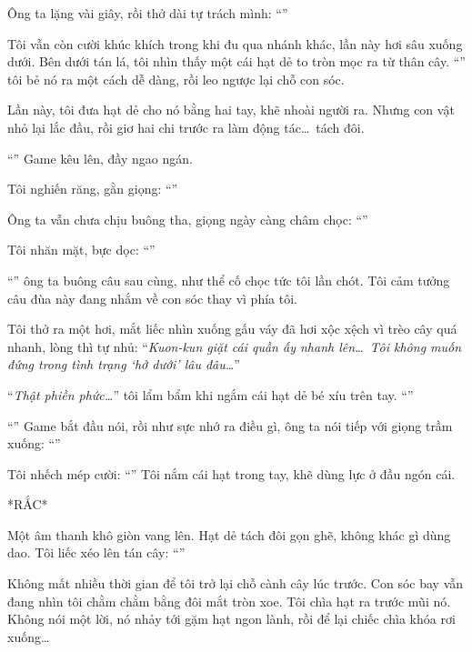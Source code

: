 \documentclass[../main.tex]{subfiles}
\begin{document}
Ông ta lặng vài giây, rồi thở dài tự trách mình: ``''

Tôi vẫn còn cười khúc khích trong khi đu qua nhánh khác, lần này hơi sâu xuống dưới. Bên dưới tán lá, tôi nhìn thấy một cái hạt dẻ to tròn mọc ra từ thân cây. ``'' tôi bẻ nó ra một cách dễ dàng, rồi leo ngược lại chỗ con sóc.

Lần này, tôi đưa hạt dẻ cho nó bằng hai tay, khẽ nhoài người ra. Nhưng con vật nhỏ lại lắc đầu, rồi giơ hai chi trước ra làm động tác\dots\ tách đôi.

``'' Game kêu lên, đầy ngao ngán.

Tôi nghiến răng, gằn giọng: ``''

Ông ta vẫn chưa chịu buông tha, giọng ngày càng châm chọc: ``''

Tôi nhăn mặt, bực dọc: ``''

``'' ông ta buông câu sau cùng, như thể cố chọc tức tôi lần chót. Tôi cảm tưởng câu đùa này đang nhắm về con sóc thay vì phía tôi.

Tôi thở ra một hơi, mắt liếc nhìn xuống gấu váy đã hơi xộc xệch vì trèo cây quá nhanh, lòng thì tự nhủ: ``\textit{Kuon-kun giặt cái quần ấy nhanh lên\dots\ Tôi không muốn đứng trong tình trạng `hở dưới' lâu đâu\dots}''

``\textit{Thật phiền phức\dots}'' tôi lẩm bẩm khi ngắm cái hạt dẻ bé xíu trên tay. ``''

``'' Game bắt đầu nói, rồi như sực nhớ ra điều gì, ông ta nói tiếp với giọng trầm xuống: ``''

Tôi nhếch mép cười: ``'' Tôi nắm cái hạt trong tay, khẽ dùng lực ở đầu ngón cái.

*RẮC*

Một âm thanh khô giòn vang lên. Hạt dẻ tách đôi gọn ghẽ, không khác gì dùng dao. Tôi liếc xéo lên tán cây: ``''

Không mất nhiều thời gian để tôi trở lại chỗ cành cây lúc trước. Con sóc bay vẫn đang nhìn tôi chằm chằm bằng đôi mắt tròn xoe. Tôi chìa hạt ra trước mũi nó. Không nói một lời, nó nhảy tới gặm hạt ngon lành, rồi để lại chiếc chìa khóa rơi xuống\dots
\end{document}
